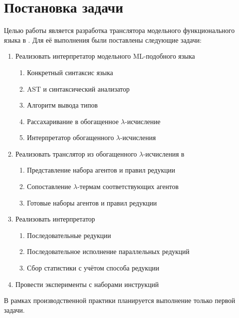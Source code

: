 
\section{Постановка задачи}
\label{sec:task}

Целью работы является разработка транслятора модельного функционального языка в \INs{}.
Для её выполнения были поставлены следующие задачи:

\begin{enumerate}
    \item Реализовать интерпретатор модельного ML-подобного языка
          \begin{enumerate}
              \item Конкретный синтаксис языка
              \item AST и синтаксический анализатор
              \item Алгоритм вывода типов
              \item Рассахаривание в обогащенное $\lambda$-исчисление
              \item Интерпретатор обогащенного $\lambda$-исчисления
          \end{enumerate}
    \item Реализовать транслятор из обогащенного $\lambda$-исчисления в \INs{}
          \begin{enumerate}
              \item Представление набора агентов и правил редукции
              \item Сопоставление $\lambda$-термам соответствующих агентов
              \item Готовые наборы агентов и правил редукции
          \end{enumerate}
    \item Реализовать интерпретатор \INs{}
          \begin{enumerate}
              \item Последовательные редукции
              \item Последовательное исполнение параллельных редукций
              \item Сбор статистики с учётом способа редукции
          \end{enumerate}
    \item Провести эксперименты с наборами инструкций
\end{enumerate}

В рамках производственной практики планируется выполнение только первой задачи.
